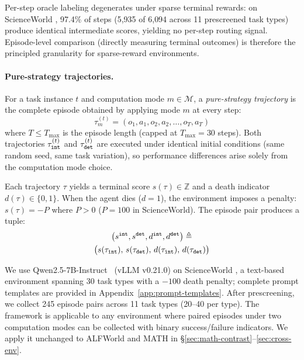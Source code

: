 Per-step oracle labeling degenerates under sparse terminal rewards: on ScienceWorld \citep{scienceworld-2022}, 97.4\% of steps (5{,}935 of 6{,}094 across 11 prescreened task types) produce identical intermediate scores, yielding no per-step routing signal. Episode-level comparison (directly measuring terminal outcomes) is therefore the principled granularity for sparse-reward environments.

\paragraph{Pure-strategy trajectories.}
For a task instance $t$ and computation mode $m \in \mathcal{M}$, a \emph{pure-strategy trajectory} is the complete episode obtained by applying mode $m$ at every step:
\begin{equation}
    \tau_m^{(t)} = (o_1, a_1, o_2, a_2, \ldots, o_T, a_T)
\end{equation}
where $T \leq T_{\max}$ is the episode length (capped at $T_{\max} = 30$ steps). Both trajectories $\tau_{\tt int}^{(t)}$ and $\tau_{\tt det}^{(t)}$ are executed under identical initial conditions (same random seed, same task variation), so performance differences arise solely from the computation mode choice.

Each trajectory $\tau$ yields a terminal score $s(\tau) \in \mathbb{Z}$ and a death indicator $d(\tau) \in \{0, 1\}$. When the agent dies ($d = 1$), the environment imposes a penalty: $s(\tau) = -P$ where $P > 0$ ($P = 100$ in ScienceWorld). The episode pair produces a tuple:
\begin{multline}
    \bigl(s^{\tt int}, s^{\tt det}, d^{\tt int}, d^{\tt det}\bigr) \triangleq \\
    \bigl(s(\tau_{\tt int}),\, s(\tau_{\tt det}),\, d(\tau_{\tt int}),\, d(\tau_{\tt det})\bigr)
\end{multline}

We use Qwen2.5-7B-Instruct~\citep{qwen25-2024} (vLLM v0.21.0) on ScienceWorld \citep{scienceworld-2022}, a text-based environment spanning 30 task types with a $-100$ death penalty; complete prompt templates are provided in Appendix~\ref{app:prompt-templates}. After prescreening, we collect 245 episode pairs across 11 task types (20--40 per type). The framework is applicable to any environment where paired episodes under two computation modes can be collected with binary success/failure indicators. We apply it unchanged to ALFWorld and MATH in \S\ref{sec:math-contrast}--\ref{sec:cross-env}.

